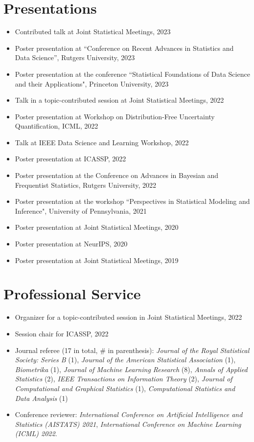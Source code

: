 \documentclass[letterpaper,11pt]{article}
\begin{document}
	\section{Presentations}
	\begin{itemize}
		\item Contributed talk at Joint Statistical Meetings, 2023
		\item Poster presentation at ``Conference on Recent Advances in Statistics and Data Science'', Rutgers University, 2023
		\item Poster presentation at the conference ``Statistical Foundations of Data Science and their Applications", Princeton University, 2023
		\item Talk in a topic-contributed session at Joint Statistical Meetings, 2022
		\item Poster presentation at Workshop on Distribution-Free Uncertainty Quantification, ICML, 2022
		\item Talk at IEEE Data Science and Learning Workshop, 2022
		\item Poster presentation at ICASSP, 2022
		\item Poster presentation at the Conference on Advances in Bayesian and Frequentist Statistics, Rutgers University, 2022
		\item Poster presentation at the workshop ``Perspectives in Statistical Modeling and Inference", University of Pennsylvania, 2021
		\item Poster presentation at Joint Statistical Meetings, 2020
		\item Poster presentation at NeurIPS, 2020
		\item Poster presentation at Joint Statistical Meetings, 2019 
	\end{itemize}
	\section{Professional Service}
	\begin{itemize}
		\item Organizer for a topic-contributed session in Joint Statistical Meetings, 2022\\
		\item Session chair for ICASSP, 2022\\
		\item Journal referee (17 in total, \# in parenthesis): {\em Journal of the Royal Statistical Society: Series B} (1), {\em Journal of the American Statistical Association} (1), {\em Biometrika} (1), {\em Journal of Machine Learning Research} (8), {\em Annals of Applied Statistics} (2), {\em IEEE Transactions on Information Theory} (2), {\em Journal of Computational and Graphical Statistics} (1), {\em Computational Statistics and Data Analysis} (1)
		\item Conference reviewer: {\em International Conference on Artificial Intelligence and Statistics (AISTATS) 2021}, {\em International Conference on Machine Learning (ICML) 2022}.
	\end{itemize}
\end{document}
